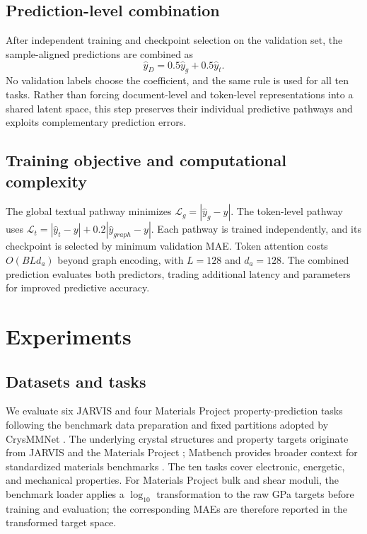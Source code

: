 \documentclass[a4paper,fleqn]{cas-sc}
\begin{document}
\subsection{Prediction-level combination}
After independent training and checkpoint selection on the validation set, the sample-aligned predictions are combined as
\begin{equation}\label{eq:dual}
\hat y_D=0.5\hat y_g+0.5\hat y_t.
\end{equation}
No validation labels choose the coefficient, and the same rule is used for all ten tasks. Rather than forcing document-level and token-level representations into a shared latent space, this step preserves their individual predictive pathways and exploits complementary prediction errors.

\subsection{Training objective and computational complexity}
The global textual pathway minimizes $\mathcal L_g=|\hat y_g-y|$. The token-level pathway uses $\mathcal L_t=|\hat y_t-y|+0.2|\hat y_{graph}-y|$. Each pathway is trained independently, and its checkpoint is selected by minimum validation MAE. Token attention costs $O(BLd_a)$ beyond graph encoding, with $L=128$ and $d_a=128$. The combined prediction evaluates both predictors, trading additional latency and parameters for improved predictive accuracy.

\FloatBarrier
\section{Experiments}
\subsection{Datasets and tasks}
We evaluate six JARVIS and four Materials Project property-prediction tasks following the benchmark data preparation and fixed partitions adopted by CrysMMNet \citep{das2023crysmmnet}. The underlying crystal structures and property targets originate from JARVIS and the Materials Project \citep{choudhary2020jarvis,jain2013materialsproject}; Matbench provides broader context for standardized materials benchmarks \citep{dunn2020matbench}. The ten tasks cover electronic, energetic, and mechanical properties. For Materials Project bulk and shear moduli, the benchmark loader applies a $\log_{10}$ transformation to the raw GPa targets before training and evaluation; the corresponding MAEs are therefore reported in the transformed target space.
\end{document}
